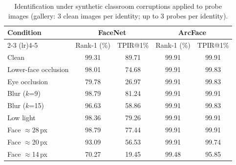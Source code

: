 \begin{table}[H]
\caption{Identification under synthetic classroom corruptions applied to probe images (gallery: 3 clean images per identity; up to 3 probes per identity).}
\centering
\label{tab:att_rob}
\begin{tabular}{lcccc}
\toprule
\multirow{2}{*}{\bf Condition} & \multicolumn{2}{c}{\bf FaceNet} & \multicolumn{2}{c}{\bf ArcFace} \\
\cmidrule(lr){2-3} \cmidrule(lr){4-5}
 & Rank-1 (\%) & TPIR@1\% & Rank-1 (\%) & TPIR@1\% \\
\midrule
Clean & 99.31 & 89.71 & 99.91 & 99.91 \\
Lower-face occlusion & 98.01 & 74.68 & 99.91 & 99.83 \\
Eye occlusion & 79.78 & 26.97 & 99.91 & 99.83 \\
Blur ($k$=9) & 98.79 & 81.24 & 99.91 & 99.91 \\
Blur ($k$=15) & 96.63 & 58.86 & 99.91 & 99.83 \\
Low light & 98.36 & 79.26 & 99.91 & 99.91 \\
Face $\approx$28\,px & 98.79 & 77.44 & 99.91 & 99.91 \\
Face $\approx$20\,px & 93.09 & 56.53 & 99.91 & 99.74 \\
Face $\approx$14\,px & 70.27 & 19.45 & 99.48 & 95.85 \\
\bottomrule
\end{tabular}
\end{table}
